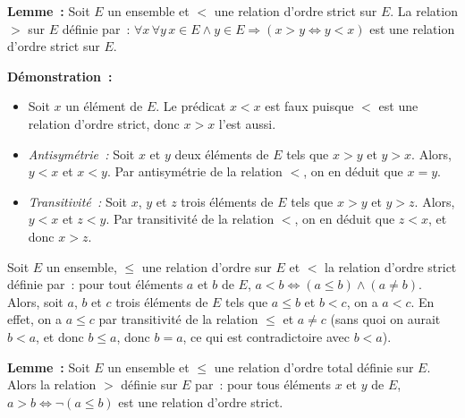    \done 

\medskip

\noindent\textbf{Lemme :} Soit $E$ un ensemble et $<$ une relation d'ordre strict sur $E$. 
    La relation $>$ sur $E$ définie par : $\forall x \, \forall y \, x \in E \wedge y \in E \Rightarrow (x > y \Leftrightarrow y < x)$ est une relation d'ordre strict sur $E$. 

\medskip

\noindent\textbf{Démonstration :}
\begin{itemize}[nosep]
    \item Soit $x$ un élément de $E$. Le prédicat $x < x$ est faux puisque $<$ est une relation d'ordre strict, donc $x > x$ l'est aussi. 
    \item \textit{Antisymétrie :} Soit $x$ et $y$ deux éléments de $E$ tels que $x > y$ et $y > x$.
        Alors, $y < x$ et $x < y$.
        Par antisymétrie de la relation $<$, on en déduit que $x = y$.
    \item \textit{Transitivité :} Soit $x$, $y$ et $z$ trois éléments de $E$ tels que $x > y$ et $y > z$.
        Alors, $y < x$ et $z < y$.
        Par transitivité de la relation $<$, on en déduit que $z < x$, et donc $x > z$.
\end{itemize}

\done

\medskip

Soit $E$ un ensemble, $\leq$ une relation d'ordre sur $E$ et $<$ la relation d'ordre strict définie par : pour tout éléments $a$ et $b$ de $E$, $a < b \Leftrightarrow (a \leq b) \wedge (a \neq b)$. 
Alors, soit $a$, $b$ et $c$ trois éléments de $E$ tels que $a \leq b$ et $b < c$, on a $a < c$. 
En effet, on a $a \leq c$ par transitivité de la relation $\leq$ et $a \neq c$ (sans quoi on aurait $b < a$, et donc $b \leq a$, donc $b = a$, ce qui est contradictoire avec $b < a$). 

\medskip

\noindent\textbf{Lemme :} Soit $E$ un ensemble et $\leq$ une relation d'ordre total définie sur $E$. 
    Alors la relation $>$ définie sur $E$ par : pour tous éléments $x$ et $y$ de $E$, $a > b \Leftrightarrow \neg (a \leq b)$ est une relation d'ordre strict. 

\medskip

